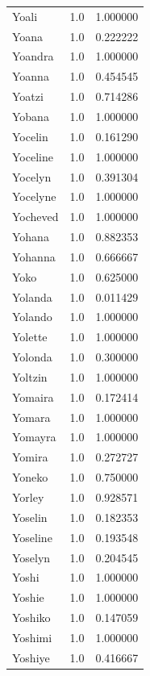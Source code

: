 \documentclass[
  letterpaper,
  DIV=11,
  numbers=noendperiod]{scrreprt}
\begin{document}
\begin{tabular}{lrr}
Yoali           &   1.0 &   1.000000 \\
Yoana           &   1.0 &   0.222222 \\
Yoandra         &   1.0 &   1.000000 \\
Yoanna          &   1.0 &   0.454545 \\
Yoatzi          &   1.0 &   0.714286 \\
Yobana          &   1.0 &   1.000000 \\
Yocelin         &   1.0 &   0.161290 \\
Yoceline        &   1.0 &   1.000000 \\
Yocelyn         &   1.0 &   0.391304 \\
Yocelyne        &   1.0 &   1.000000 \\
Yocheved        &   1.0 &   1.000000 \\
Yohana          &   1.0 &   0.882353 \\
Yohanna         &   1.0 &   0.666667 \\
Yoko            &   1.0 &   0.625000 \\
Yolanda         &   1.0 &   0.011429 \\
Yolando         &   1.0 &   1.000000 \\
Yolette         &   1.0 &   1.000000 \\
Yolonda         &   1.0 &   0.300000 \\
Yoltzin         &   1.0 &   1.000000 \\
Yomaira         &   1.0 &   0.172414 \\
Yomara          &   1.0 &   1.000000 \\
Yomayra         &   1.0 &   1.000000 \\
Yomira          &   1.0 &   0.272727 \\
Yoneko          &   1.0 &   0.750000 \\
Yorley          &   1.0 &   0.928571 \\
Yoselin         &   1.0 &   0.182353 \\
Yoseline        &   1.0 &   0.193548 \\
Yoselyn         &   1.0 &   0.204545 \\
Yoshi           &   1.0 &   1.000000 \\
Yoshie          &   1.0 &   1.000000 \\
Yoshiko         &   1.0 &   0.147059 \\
Yoshimi         &   1.0 &   1.000000 \\
Yoshiye         &   1.0 &   0.416667 \\

\end{tabular}
\end{document}
